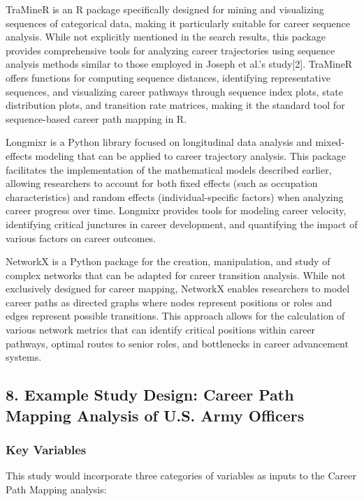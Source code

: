 \documentclass[
  letterpaper,
  DIV=11,
  numbers=noendperiod]{scrartcl}
\begin{document}
TraMineR is an R package specifically designed for mining and
visualizing sequences of categorical data, making it particularly
suitable for career sequence analysis. While not explicitly mentioned in
the search results, this package provides comprehensive tools for
analyzing career trajectories using sequence analysis methods similar to
those employed in Joseph et al.'s study{[}2{]}. TraMineR offers
functions for computing sequence distances, identifying representative
sequences, and visualizing career pathways through sequence index plots,
state distribution plots, and transition rate matrices, making it the
standard tool for sequence-based career path mapping in R.

Longmixr is a Python library focused on longitudinal data analysis and
mixed-effects modeling that can be applied to career trajectory
analysis. This package facilitates the implementation of the
mathematical models described earlier, allowing researchers to account
for both fixed effects (such as occupation characteristics) and random
effects (individual-specific factors) when analyzing career progress
over time. Longmixr provides tools for modeling career velocity,
identifying critical junctures in career development, and quantifying
the impact of various factors on career outcomes.

NetworkX is a Python package for the creation, manipulation, and study
of complex networks that can be adapted for career transition analysis.
While not exclusively designed for career mapping, NetworkX enables
researchers to model career paths as directed graphs where nodes
represent positions or roles and edges represent possible transitions.
This approach allows for the calculation of various network metrics that
can identify critical positions within career pathways, optimal routes
to senior roles, and bottlenecks in career advancement systems.

\subsection{8. Example Study Design: Career Path Mapping Analysis of
U.S. Army
Officers}\label{example-study-design-career-path-mapping-analysis-of-u.s.-army-officers}

\subsubsection{Key Variables}\label{key-variables}

This study would incorporate three categories of variables as inputs to
the Career Path Mapping analysis:
\end{document}

